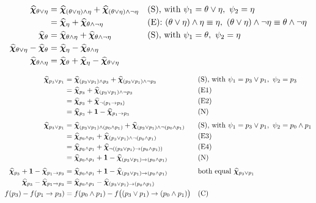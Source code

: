 \documentclass[titlepage,a4paper,11pt]{report}
\begin{document}
    \begin{align*}
        \satvec_{\theta\lor\eta}
        &=\satvec_{(\theta\lor\eta)\land\eta}+\satvec_{(\theta\lor\eta)\land\neg\eta}
        &&\text{(S), with }\psi_1=\theta\lor\eta,\ \psi_2=\eta\\
        &=\satvec_{\eta}+\satvec_{\theta\land\neg\eta}
        &&\text{(E): }(\theta\lor\eta)\land\eta\equiv\eta,\ (\theta\lor\eta)\land\neg\eta\equiv\theta\land\neg\eta\\
        \satvec_{\theta}
        &=\satvec_{\theta\land\eta}+\satvec_{\theta\land\neg\eta}
        &&\text{(S), with }\psi_1=\theta,\ \psi_2=\eta\\
        \satvec_{\theta\lor\eta}-\satvec_{\theta}
        &=\satvec_{\eta}-\satvec_{\theta\land\eta}\\
        \satvec_{\theta\land\eta}
        &=\satvec_{\theta}+\satvec_{\eta}-\satvec_{\theta\lor\eta}
    \end{align*}
    
    \begin{align*}
        \bm{\widehat\chi}_{p_3\lor p_1}
        &=\bm{\widehat\chi}_{(p_3\lor p_1)\land p_3}+\bm{\widehat\chi}_{(p_3\lor p_1)\land\neg p_3}
        &&\text{(S), with }\psi_1=p_3\lor p_1,\ \psi_2=p_3\\
        &=\bm{\widehat\chi}_{p_3}+\bm{\widehat\chi}_{(p_3\lor p_1)\land\neg p_3}
        &&\text{(E1)}\\
        &=\bm{\widehat\chi}_{p_3}+\bm{\widehat\chi}_{\neg(p_1\to p_3)}
        &&\text{(E2)}\\
        &=\bm{\widehat\chi}_{p_3}+\mathbf 1-\bm{\widehat\chi}_{p_1\to p_3}
        &&\text{(N)}\\[4pt]
        \bm{\widehat\chi}_{p_3\lor p_1}
        &=\bm{\widehat\chi}_{(p_3\lor p_1)\land(p_0\land p_1)}+\bm{\widehat\chi}_{(p_3\lor p_1)\land\neg(p_0\land p_1)}
        &&\text{(S), with }\psi_1=p_3\lor p_1,\ \psi_2=p_0\land p_1\\
        &=\bm{\widehat\chi}_{p_0\land p_1}+\bm{\widehat\chi}_{(p_3\lor p_1)\land\neg(p_0\land p_1)}
        &&\text{(E3)}\\
        &=\bm{\widehat\chi}_{p_0\land p_1}+\bm{\widehat\chi}_{\neg((p_3\lor p_1)\to(p_0\land p_1))}
        &&\text{(E4)}\\
        &=\bm{\widehat\chi}_{p_0\land p_1}+\mathbf 1-\bm{\widehat\chi}_{(p_3\lor p_1)\to(p_0\land p_1)}
        &&\text{(N)}\\[4pt]
        \bm{\widehat\chi}_{p_3}+\mathbf 1-\bm{\widehat\chi}_{p_1\to p_3}
        &=\bm{\widehat\chi}_{p_0\land p_1}+\mathbf 1-\bm{\widehat\chi}_{(p_3\lor p_1)\to(p_0\land p_1)}
        &&\text{both equal }\bm{\widehat\chi}_{p_3\lor p_1}\\
        \bm{\widehat\chi}_{p_3}-\bm{\widehat\chi}_{p_1\to p_3}
        &=\bm{\widehat\chi}_{p_0\land p_1}-\bm{\widehat\chi}_{(p_3\lor p_1)\to(p_0\land p_1)}\\
        f(p_3)-f(p_1\to p_3)
        &=f(p_0\land p_1)-f\bigl((p_3\lor p_1)\to(p_0\land p_1)\bigr)
        &&\text{(C)}
    \end{align*}
    
\end{document}
